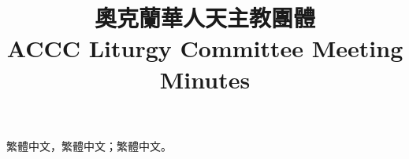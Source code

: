 \documentclass{article}
\title{ 奧克蘭華人天主教團體 \\ ACCC Liturgy Committee Meeting Minutes}
\date{}
\begin{document}
\maketitle

繁體中文，繁體中文；繁體中文。
\end{document}
